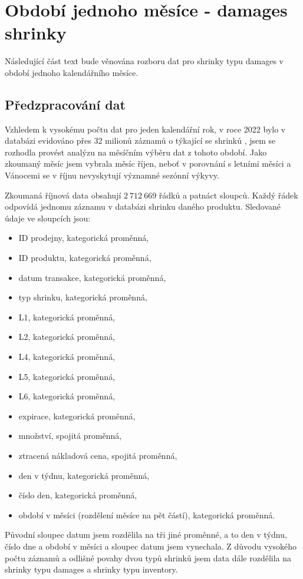 \section{Období jednoho měsíce - damages shrinky}

Následující část text bude věnována rozboru dat pro shrinky typu damages v období jednoho kalendářního měsíce.

\subsection{Předzpracování dat}


Vzhledem k vysokému počtu dat pro jeden kalendářní rok, 
v roce 2022 bylo v databázi evidováno přes 32 milionů záznamů o týkající se shrinků
, jsem se rozhodla provést analýzu na měsíčním výběru dat z tohoto období. Jako zkoumaný měsíc jsem vybrala měsíc říjen, neboť v porovnání s letními měsíci a Vánocemi se v říjnu nevyskytují významné sezónní výkyvy.


Zkoumaná říjnová data obsahují $2\ 712\ 669$ řádků a patnáct sloupců. Každý řádek odpovídá jednomu záznamu v databázi shrinku daného produktu. Sledované údaje ve sloupcích jsou: 
\begin{itemize}
    \item ID prodejny, kategorická proměnná,
    \item ID produktu, kategorická proměnná,
    \item datum transakce, kategorická proměnná,
    \item typ shrinku, kategorická proměnná,
    \item L1, kategorická proměnná,
    \item L2, kategorická proměnná,
    \item L4, kategorická proměnná,
    \item L5, kategorická proměnná,
    \item L6, kategorická proměnná,
    \item expirace, kategorická proměnná,
    \item množství, spojitá proměnná,
    \item ztracená nákladová cena, spojitá proměnná,
    \item den v týdnu, kategorická proměnná,
    \item číslo den, kategorická proměnná,
    \item období v měsíci (rozdělení měsíce na pět částí), kategorická proměnná.
\end{itemize}
Původní sloupec datum jsem rozdělila na tři jiné proměnné, a to den v týdnu, číslo dne a období v měsíci a sloupec datum jsem vynechala. Z důvodu vysokého počtu záznamů a odlišné povahy dvou typů shrinků jsem data dále rozdělila na shrinky typu damages a shrinky typu inventory. 


